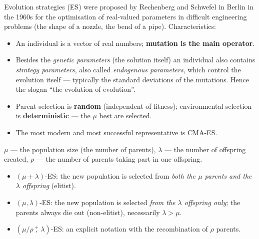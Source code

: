 \documentclass[11pt,a4paper]{article}
\theoremstyle{definition}
\providecommand{\uv}[1]{``#1''}
\begin{document}
Evolution strategies (ES) were proposed by Rechenberg and Schwefel in Berlin in
the 1960s for the optimisation of real-valued parameters in difficult
engineering problems (the shape of a nozzle, the bend of a pipe).
Characteristics:

\begin{itemize}
\item An individual is a vector of real numbers; \textbf{mutation is the main
  operator}.
\item Besides the \emph{genetic parameters} (the solution itself) an individual
  also contains \emph{strategy parameters}, also called \emph{endogenous
  parameters}, which control the evolution itself --- typically the standard
  deviations of the mutations. Hence the slogan \uv{the evolution of
  evolution}.
\item Parent selection is \textbf{random} (independent of fitness);
  environmental selection is \textbf{deterministic} --- the $\mu$ best are
  selected.
\item The most modern and most successful representative is CMA-ES.
\end{itemize}

\begin{defbox}[ES notation]
$\mu$ --- the population size (the number of parents), $\lambda$ --- the number
of offspring created, $\rho$ --- the number of parents taking part in one
offspring.
\begin{itemize}
\item $(\mu + \lambda)$-ES: the new population is selected from \emph{both the
  $\mu$ parents and the $\lambda$ offspring} (elitist).
\item $(\mu, \lambda)$-ES: the new population is selected \emph{from the
  $\lambda$ offspring only}; the parents always die out (non-elitist),
  necessarily $\lambda > \mu$.
\item $(\mu/\rho \,\overset{+}{,}\, \lambda)$-ES: an explicit notation with the
  recombination of $\rho$ parents.
\end{itemize}
\end{defbox}
\end{document}
